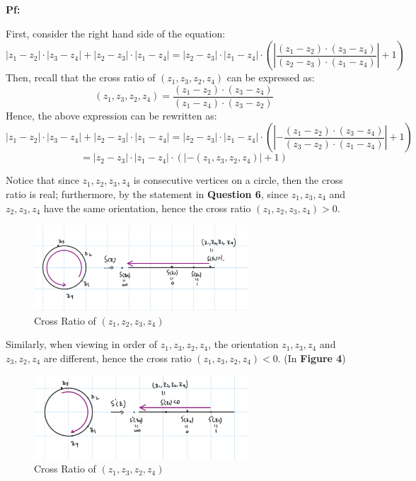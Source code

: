 \documentclass{article}
\begin{document}
\textbf{Pf:}

First, consider the right hand side of the equation:
$$|z_1-z_2|\cdot|z_3-z_4|+|z_2-z_3|\cdot|z_1-z_4| = |z_2-z_3|\cdot|z_1-z_4|\cdot\left(\left|\frac{(z_1-z_2)\cdot(z_3-z_4)}{(z_2-z_3)\cdot(z_1-z_4)}\right|+1\right)$$
Then, recall that the cross ratio of $(z_1,z_3,z_2,z_4)$ can be expressed as:
$$(z_1,z_3,z_2,z_4)=\frac{(z_1-z_2)\cdot(z_3-z_4)}{(z_1-z_4)\cdot(z_3-z_2)}$$
Hence, the above expression can be rewritten as:
$$|z_1-z_2|\cdot|z_3-z_4|+|z_2-z_3|\cdot|z_1-z_4| = |z_2-z_3|\cdot|z_1-z_4|\cdot\left(\left|-\frac{(z_1-z_2)\cdot(z_3-z_4)}{(z_3-z_2)\cdot(z_1-z_4)}\right|+1\right)$$
$$=|z_2-z_3|\cdot|z_1-z_4|\cdot(|-(z_1,z_3,z_2,z_4)|+1)$$

\hfill

Notice that since $z_1,z_2,z_3,z_4$ is consecutive vertices on a circle, then the cross ratio is real; 
furthermore, by the statement in \textbf{Question 6}, since $z_1,z_3,z_4$ and $z_2,z_3,z_4$ have the same orientation,
hence the cross ratio $(z_1,z_2,z_3,z_4)>0$.

\begin{figure}[h!]
    \begin{center}
        \includegraphics*[width=80mm]{cross ratio 1.jpg}
    \end{center}
    \caption{Cross Ratio of $(z_1,z_2,z_3,z_4)$}
\end{figure}

\hfill

Similarly, when viewing in order of $z_1,z_3,z_2,z_4$, the orientation $z_1,z_3,z_4$ and $z_3,z_2,z_4$ are different,
hence the cross ratio $(z_1,z_3,z_2,z_4)<0$. (In \textbf{Figure 4})

\begin{figure}[h!]
    \begin{center}
        \includegraphics*[width=80mm]{cross ratio 2.jpg}
    \end{center}
    \caption{Cross Ratio of $(z_1,z_3,z_2,z_4)$}
\end{figure}
\end{document}
